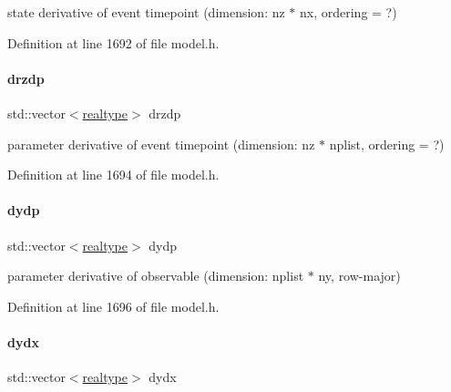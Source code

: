 state derivative of event timepoint (dimension\+: nz $\ast$ nx, ordering = ?) 

Definition at line 1692 of file model.\+h.

\mbox{\label{classamici_1_1_model_af996feb03ef94b432683ea74277cc4a8}} 
\paragraph{\texorpdfstring{drzdp}{drzdp}}
{\footnotesize\ttfamily std\+::vector$<$\mbox{\hyperlink{namespaceamici_a1bdce28051d6a53868f7ccbf5f2c14a3}{realtype}}$>$ drzdp\hspace{0.3cm}{\ttfamily [protected]}}

parameter derivative of event timepoint (dimension\+: nz $\ast$ nplist, ordering = ?) 

Definition at line 1694 of file model.\+h.

\mbox{\label{classamici_1_1_model_a19a0e6ca8882314d7dd4e8f2fcc841fd}} 
\paragraph{\texorpdfstring{dydp}{dydp}}
{\footnotesize\ttfamily std\+::vector$<$\mbox{\hyperlink{namespaceamici_a1bdce28051d6a53868f7ccbf5f2c14a3}{realtype}}$>$ dydp\hspace{0.3cm}{\ttfamily [protected]}}

parameter derivative of observable (dimension\+: nplist $\ast$ ny, row-\/major) 

Definition at line 1696 of file model.\+h.

\mbox{\label{classamici_1_1_model_ace5ccde1d7a065614717cd85fce09f9d}} 
\paragraph{\texorpdfstring{dydx}{dydx}}
{\footnotesize\ttfamily std\+::vector$<$\mbox{\hyperlink{namespaceamici_a1bdce28051d6a53868f7ccbf5f2c14a3}{realtype}}$>$ dydx\hspace{0.3cm}{\ttfamily [protected]}}

